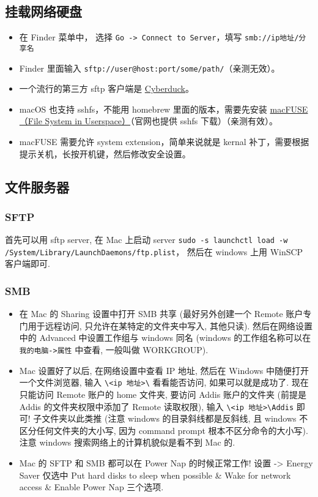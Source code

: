 \subsection{挂载网络硬盘}
\begin{itemize}
\item 在 Finder 菜单中， 选择 \verb`Go -> Connect to Server`，填写 \verb`smb://ip地址/分享名`
\item Finder 里面输入 \verb`sftp://user@host:port/some/path/`（亲测无效）。
\item 一个流行的第三方 sftp 客户端是 \href{https://cyberduck.io/}{Cyberduck}。
\item macOS 也支持 sshfs，不能用 homebrew 里面的版本，需要先安装 \href{https://osxfuse.github.io/}{macFUSE（File System in Userspace）}（官网也提供 sshfs 下载）（亲测有效）。
\item macFUSE 需要允许 system extension，简单来说就是 kernal 补丁，需要根据提示关机，长按开机键，然后修改安全设置。
\end{itemize}

\subsection{文件服务器}
\subsubsection{SFTP}
首先可以用 sftp server, 在 Mac 上启动 server
\verb`sudo -s launchctl load -w /System/Library/LaunchDaemons/ftp.plist`， 然后在 windows 上用 WinSCP 客户端即可.

\subsubsection{SMB}
\begin{itemize}
\item 在 Mac 的 Sharing 设置中打开 SMB 共享 (最好另外创建一个 Remote 账户专门用于远程访问, 只允许在某特定的文件夹中写入, 其他只读). 然后在网络设置中的 Advanced 中设置工作组与 windows 同名 (windows 的工作组名称可以在 \verb`我的电脑->属性` 中查看, 一般叫做 WORKGROUP).

\item Mac 设置好了以后, 在网络设置中查看 IP 地址, 然后在 Windows 中随便打开一个文件浏览器, 输入 \verb`\<ip 地址>\` 看看能否访问, 如果可以就是成功了. 现在只能访问 Remote 账户的 home 文件夹, 要访问 Addis 账户的文件夹 (前提是 Addis 的文件夹权限中添加了 Remote 读取权限), 输入 \verb`\<ip 地址>\Addis` 即可! 子文件夹以此类推 (注意 windows 的目录斜线都是反斜线, 且 windows 不区分任何文件夹的大小写, 因为 command prompt 根本不区分命令的大小写). 注意 windows 搜索网络上的计算机貌似是看不到 Mac 的.

\item Mac 的 SFTP 和 SMB 都可以在 Power Nap 的时候正常工作! 设置 -> Energy Saver 仅选中 Put hard disks to sleep when possible \& Wake for network access \& Enable Power Nap 三个选项.
\end{itemize}


